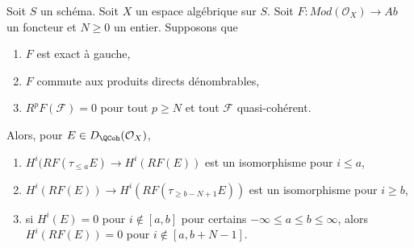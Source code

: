\begin{lemma}
\label{lemma-application-nice-K-injective}
Soit $S$ un schéma. Soit $X$ un espace algébrique sur $S$.
Soit $F : \textit{Mod}(\mathcal{O}_X) \to \textit{Ab}$
un foncteur et $N \geq 0$ un entier. Supposons que
\begin{enumerate}
\item $F$ est exact à gauche,
\item $F$ commute aux produits directs dénombrables,
\item $R^pF(\mathcal{F}) = 0$ pour tout $p \geq N$ et tout $\mathcal{F}$
quasi-cohérent.
\end{enumerate}
Alors, pour $E \in D_\QCoh(\mathcal{O}_X)$,
\begin{enumerate}
\item $H^i(RF(\tau_{\leq a}E) \to H^i(RF(E))$ est un isomorphisme
pour $i \leq a$,
\item $H^i(RF(E)) \to H^i(RF(\tau_{\geq b - N + 1}E))$ est un isomorphisme
pour $i \geq b$,
\item si $H^i(E) = 0$ pour $i \not \in [a, b]$ pour certains
$-\infty \leq a \leq b \leq \infty$, alors $H^i(RF(E)) = 0$
pour $i \not \in [a, b + N - 1]$.
\end{enumerate}
\end{lemma}

